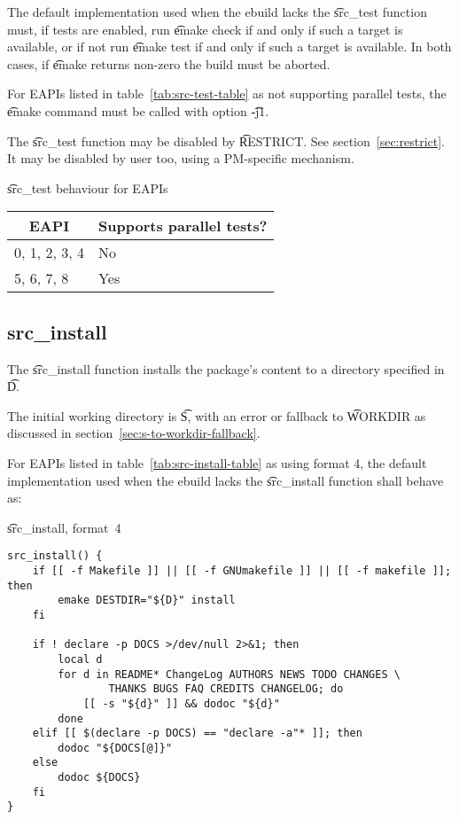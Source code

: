 The default implementation used when the ebuild lacks the \t{src_test} function must, if tests are
enabled, run \t{emake check} if and only if such a target is available, or if not run
\t{emake test} if and only if such a target is available. In both cases, if \t{emake} returns
non-zero the build must be aborted.

 For EAPIs listed in table~\ref{tab:src-test-table} as not supporting
parallel tests, the \t{emake} command must be called with option \t{-j1}.

The \t{src_test} function may be disabled by \t{RESTRICT}\@. See section~\ref{sec:restrict}. It may
be disabled by user too, using a PM-specific mechanism.

\begin{centertable}{\t{src_test} behaviour for EAPIs}
    \label{tab:src-test-table}
    \begin{tabular}{ll}
      \toprule
      \multicolumn{1}{c}{\textbf{EAPI}} &
      \multicolumn{1}{c}{\textbf{Supports parallel tests?}} \\
      \midrule
      0, 1, 2, 3, 4     & No  \\
      5, 6, 7, 8        & Yes \\
      \bottomrule
    \end{tabular}
\end{centertable}

\subsection{src_install}

 The \t{src_install} function installs the package's content to a
directory specified in \t{D}.

The initial working directory is \t{S}, with an error or fallback to \t{WORKDIR} as discussed in
section~\ref{sec:s-to-workdir-fallback}.

 For EAPIs listed in table~\ref{tab:src-install-table} as using format
4, the default implementation used when the ebuild lacks the \t{src_install} function shall behave
as:

\begin{listing}[H]
\caption{\t{src_install}, format~4}
\begin{verbatim}
src_install() {
    if [[ -f Makefile ]] || [[ -f GNUmakefile ]] || [[ -f makefile ]]; then
        emake DESTDIR="${D}" install
    fi

    if ! declare -p DOCS >/dev/null 2>&1; then
        local d
        for d in README* ChangeLog AUTHORS NEWS TODO CHANGES \
                THANKS BUGS FAQ CREDITS CHANGELOG; do
            [[ -s "${d}" ]] && dodoc "${d}"
        done
    elif [[ $(declare -p DOCS) == "declare -a"* ]]; then
        dodoc "${DOCS[@]}"
    else
        dodoc ${DOCS}
    fi
}
\end{verbatim}
\end{listing}

